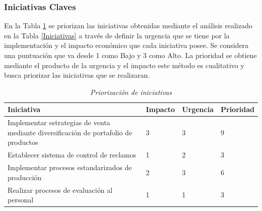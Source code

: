 \documentclass[12pt, a4paper]{article}
\begin{document}
\subsubsection{Iniciativas Claves}
En la  Tabla \ref{Priorizacion:Iniciativas} se priorizan las iniciativas obtenidas mediante el análisis realizado en la Tabla \ref{Iniciativas} a través de definir la urgencia que se tiene por la implementación y el impacto económico que cada iniciativa posee. Se considera una puntuación que va desde 1 como Bajo y 3 como Alto. La prioridad se obtiene mediante el producto de la urgencia y el impacto este método es cualitativo y busca priorizar las iniciativas que se realizaran.

\begin{table}[H]
\centering
\caption{\textit{ Priorización de iniciativas} }
\label{Priorizacion:Iniciativas}
\begin{tabular}{|p{5cm}|l|l|l|}
\hline
\textbf{Iniciativa} & \textbf{Impacto} & \textbf{Urgencia} & \textbf{Prioridad} \\ \hline
Implementar estrategias de venta mediante diversificación de portafolio de productos & 3 & 3 & 9 \\ \hline
Establecer sistema de control de reclamos & 1 & 2 & 3 \\ \hline
Implementar procesos estandarizados de producción & 2 & 3 & 6 \\ \hline
Realizar procesos de evaluación al personal & 1 & 1 & 3 \\ \hline
\end{tabular}
\end{table}
\end{document}
